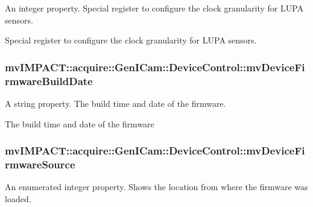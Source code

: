 An integer property. Special register to configure the clock granularity for L\+U\+P\+A sensors. 

Special register to configure the clock granularity for L\+U\+P\+A sensors. \hypertarget{classmv_i_m_p_a_c_t_1_1acquire_1_1_gen_i_cam_1_1_device_control_a9b2853b6b68c5ce673c604bd260f61a0}{
\subsubsection[{mv\+Device\+Firmware\+Build\+Date}]{ mv\+I\+M\+P\+A\+C\+T\+::acquire\+::\+Gen\+I\+Cam\+::\+Device\+Control\+::mv\+Device\+Firmware\+Build\+Date}}\label{classmv_i_m_p_a_c_t_1_1acquire_1_1_gen_i_cam_1_1_device_control_a9b2853b6b68c5ce673c604bd260f61a0}


A string property. The build time and date of the firmware. 

The build time and date of the firmware \hypertarget{classmv_i_m_p_a_c_t_1_1acquire_1_1_gen_i_cam_1_1_device_control_a0e0cc359d7bf6588c9143fb5a5adadff}{
\subsubsection[{mv\+Device\+Firmware\+Source}]{ mv\+I\+M\+P\+A\+C\+T\+::acquire\+::\+Gen\+I\+Cam\+::\+Device\+Control\+::mv\+Device\+Firmware\+Source}}\label{classmv_i_m_p_a_c_t_1_1acquire_1_1_gen_i_cam_1_1_device_control_a0e0cc359d7bf6588c9143fb5a5adadff}


An enumerated integer property. Shows the location from where the firmware was loaded. 

